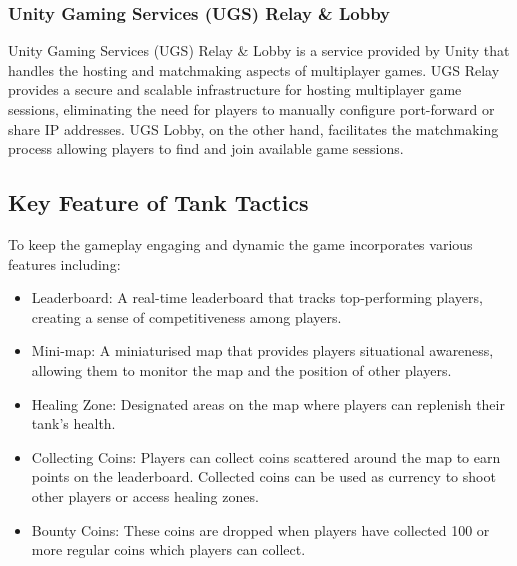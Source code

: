 \subsubsection{Unity Gaming Services (UGS) Relay \& Lobby}
Unity Gaming Services (UGS) Relay \& Lobby is a service provided by Unity that handles the hosting and matchmaking aspects of multiplayer games. UGS Relay provides a secure and scalable infrastructure for hosting multiplayer game sessions, eliminating the need for players to manually configure port-forward or share IP addresses. UGS Lobby, on the other hand, facilitates the matchmaking process allowing players to find and join available game sessions.
\subsection{Key Feature of Tank Tactics}
To keep the gameplay engaging and dynamic the game incorporates various features including:
\begin{itemize}
    \item Leaderboard: A real-time leaderboard that tracks top-performing players, creating a sense of competitiveness among players.
    \item Mini-map: A miniaturised map that provides players situational awareness, allowing them to monitor the map and the position of other players.
    \item Healing Zone: Designated areas on the map where players can replenish their tank's health.
    \item Collecting Coins: Players can collect coins scattered around the map to earn points on the leaderboard. Collected coins can be used as currency to shoot other players or access healing zones.
    \item Bounty Coins: These coins are dropped when players have collected 100 or more regular coins which players can collect.
\end{itemize}

